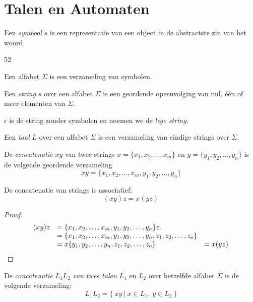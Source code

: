 \documentclass[ab.tex]{subfiles}
\begin{document}
\chapter{Talen en Automaten}
\begin{de}
Een \emph{symbool} $s$ is een representatie van een object in de abstractste zin van het woord. 
\end{de}
52
\begin{de}
Een alfabet $\Sigma$ is een verzameling van symbolen.
\end{de}

\begin{de}
Een \emph{string} $s$ over een alfabet $\Sigma$ is een geordende opeenvolging van nul, \'e\'en of meer elementen van $\Sigma$.
\end{de}

\begin{de}
$\epsilon$ is de string zonder symbolen en noemen we de \emph{lege string}.
\end{de}

\begin{de}
Een \emph{taal} $L$ over een alfabet $\Sigma$ is een verzameling van eindige strings over $\Sigma$.
\end{de}

\begin{de}
De \emph{concatenatie} $xy$ van twee strings $x = \{x_1,x_2,\ldots,x_m\}$ en $y = \{y_1,y_2,\ldots,y_n\}$ is de volgende geordende verzameling
\[
xy = \{ x_1,x_2,\ldots,x_m,y_1,y_2,\ldots,y_n\}
\] 
\end{de}

\begin{ei}
De concatenatie van strings is associatief:
\[
(xy)z = x(yz)
\]
\begin{proof}
\[
\begin{array}{r l l}
(xy)z &= \{x_1,x_2,\ldots,x_m,y_1,y_2,\ldots,y_n\}z &\\
      &= \{x_1,x_2,\ldots,x_m,y_1,y_2,\ldots,y_n,z_1,z_2,\ldots,z_o\} &\\
      &= x\{y_1,y_2,\ldots,y_n,z_1,z_2,\ldots,z_o\} &= x(yz)
\end{array}
\]
\end{proof}
\end{ei}

\begin{de}
De \emph{concatenatie} $L_1L_2$ \emph{van twee talen} $L_1$ en $L_2$ over hetzelfde alfabet $\Sigma$ is de volgende verzameling:
\[
L_1L_2 = \{\ xy\ |\ x \in L_1,\ y \in L_2\ \} 
\]
\end{de}
\end{document}
